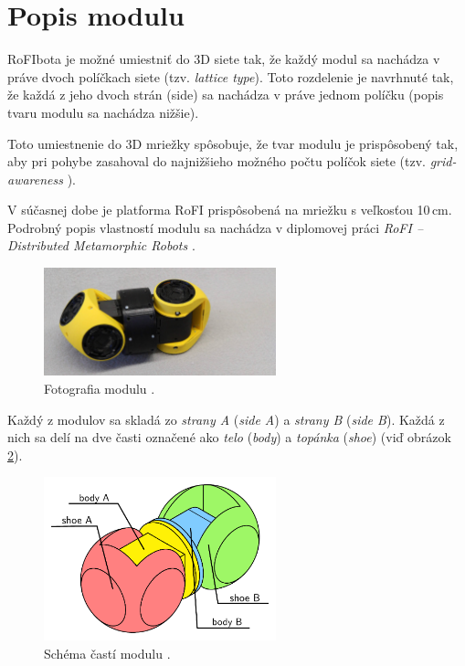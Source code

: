 \documentclass[
  digital, %
  oneside, %
  table,   %
  lof,     %
  nolot,     %
]{fithesis3}
\begin{document}
\section{Popis modulu}
\label{sec:moduleSpec}
RoFIbota je možné umiestniť do 3D siete tak, že každý modul sa nachádza v práve dvoch políčkach siete (tzv. \textit{lattice type}). Toto rozdelenie je navrhnuté tak, že každá z jeho dvoch strán (side) sa nachádza v práve jednom políčku (popis tvaru modulu sa nachádza nižšie). 

Toto umiestnenie do 3D mriežky spôsobuje, že tvar modulu je prispôsobený tak, aby pri pohybe zasahoval do najnižšieho možného počtu políčok siete (tzv. \textit{grid-awareness} \cite{mrazekMasterThesis}). 

V súčasnej dobe je platforma RoFI prispôsobená na mriežku s veľkosťou 10\,cm. Podrobný popis vlastností modulu sa nachádza v diplomovej práci \textit{RoFI – Distributed Metamorphic Robots} \cite{mrazekMasterThesis}. 

\begin{figure}[hbt!]
    \centering
    \includegraphics[width=0.6\textwidth]{pictures/module.jpg}
    \caption[Fotografia modulu]{Fotografia modulu \cite{rofiWeb}.}
    \label{fig:module}
\end{figure}

Každý z modulov sa skladá zo \textit{strany A} (\textit{side A}) a \textit{strany B} (\textit{side B}). Každá z nich sa delí na dve časti označené ako \textit{telo} (\textit{body}) a \textit{topánka} (\textit{shoe}) (viď obrázok \ref{fig:module_parts}). 

\begin{figure}[hbt!]
    \centering
    \includegraphics[width=0.6\textwidth]{pictures/module_parts.pdf}
    \caption[Časti modulu]{Schéma častí modulu \cite{mrazekMasterThesis}.}
    \label{fig:module_parts}
\end{figure}
\end{document}
